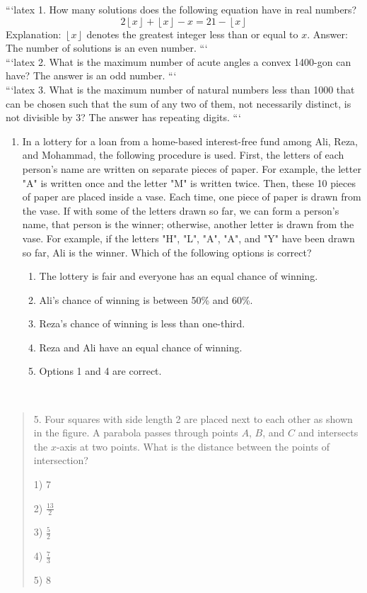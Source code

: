 ```latex
1. How many solutions does the following equation have in real numbers?  
\[
2 \left\lfloor x \right\rfloor + \left\lfloor x \right\rfloor - x = 21 - \left\lfloor x \right\rfloor
\]
Explanation: \(\left\lfloor x \right\rfloor\) denotes the greatest integer less than or equal to \(x\).  
Answer: The number of solutions is an even number.
```
\\
```latex
2. What is the maximum number of acute angles a convex 1400-gon can have? The answer is an odd number.
```
\\
```latex
3. What is the maximum number of natural numbers less than 1000 that can be chosen such that the sum of any two of them, not necessarily distinct, is not divisible by 3? The answer has repeating digits.
```
\\
\begin{enumerate}
    \item In a lottery for a loan from a home-based interest-free fund among Ali, Reza, and Mohammad, the following procedure is used. First, the letters of each person's name are written on separate pieces of paper. For example, the letter "A" is written once and the letter "M" is written twice. Then, these 10 pieces of paper are placed inside a vase. Each time, one piece of paper is drawn from the vase. If with some of the letters drawn so far, we can form a person's name, that person is the winner; otherwise, another letter is drawn from the vase. For example, if the letters "H", "L", "A", "A", and "Y" have been drawn so far, Ali is the winner. Which of the following options is correct?
    \begin{enumerate}
        \item The lottery is fair and everyone has an equal chance of winning.
        \item Ali's chance of winning is between 50\% and 60\%.
        \item Reza's chance of winning is less than one-third.
        \item Reza and Ali have an equal chance of winning.
        \item Options 1 and 4 are correct.
    \end{enumerate}
\end{enumerate}
\\
\begin{quote}
5. Four squares with side length 2 are placed next to each other as shown in the figure. A parabola passes through points $A$, $B$, and $C$ and intersects the $x$-axis at two points. What is the distance between the points of intersection?

1) 7

2) $\frac{13}{2}$

3) $\frac{5}{2}$

4) $\frac{7}{3}$

5) 8
\end{quote}
